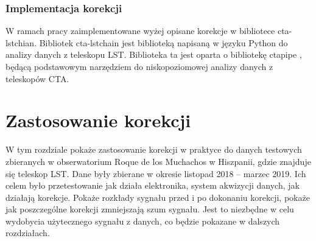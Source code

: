 \documentclass[a4paper,11pt,twoside]{article}
\begin{document}
\subsubsection{Implementacja korekcji}
W ramach pracy zaimplementowane wyżej opisane korekcje w bibliotece cta-lstchian. Bibliotek cta-lstchain \cite{lstchain_url} jest biblioteką napisaną w języku Python do analizy danych z teleskopu LST. Biblioteka ta jest oparta o bibliotekę ctapipe \cite{ctapipe_url}, będącą podstawowym narzędziem do niskopoziomowej analizy danych z teleskopów CTA.
\newpage
\section{Zastosowanie korekcji}
W tym rozdziale pokaże zastosowanie korekcji w praktyce do danych testowych zbieranych w obserwatorium Roque de los Muchachos w Hiszpanii, gdzie znajduje się teleskop LST. Dane były zbierane w okresie listopad 2018 -- marzec 2019. Ich celem było przetestowanie jak działa elektronika, system akwizycji danych, jak działają korekcje. Pokaże rozkłady sygnału przed i po dokonaniu korekcji, pokaże jak poszczególne korekcji zmniejszają szum sygnału. Jest to niezbędne w celu wydobycia użytecznego sygnału z danych, co będzie pokazane w dalszych rozdziałach.
\end{document}

